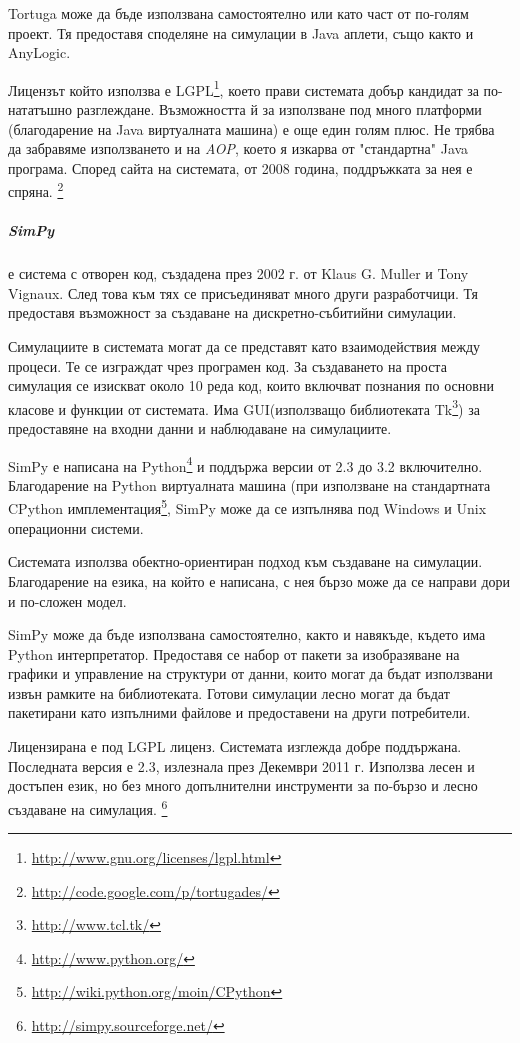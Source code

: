  			Tortuga може да бъде използвана самостоятелно или като част от по-голям проект. 
 			Тя предоставя споделяне на симулации в Java аплети, също както и AnyLogic.
 			
 			Лицензът който използва е \ac{LGPL}\footnote{\url{http://www.gnu.org/licenses/lgpl.html}}, 
 			което прави системата добър кандидат за по-нататъшно разглеждане.
 			Възможността й за използване под много платформи (благодарение на Java виртуалната машина) е 
 			още един голям плюс.
 			Не трябва да забравяме използването и на \emph{AOP}, което я изкарва от "стандартна" Java програма.
 			Според сайта на системата, от 2008 година, поддръжката за нея е спряна. \footnote{\url{http://code.google.com/p/tortugades/}}
					
		\subparagraph{SimPy} е система с отворен код, създадена през 2002 г. от Klaus G. Muller и Tony Vignaux. След това
			към тях се присъединяват много други разработчици. 
			Тя предоставя възможност за създаване на дискретно-събитийни симулации.
			
			Симулациите в системата могат да се представят като взаимодействия между процеси. Те се изграждат чрез
			програмен код. За създаването на проста симулация се изискват около 10 реда код, 
			които включват познания по основни класове и функции от системата. Има GUI(използващо библиотеката 
			Tk\footnote{\url{http://www.tcl.tk/}}) за предоставяне на входни данни и наблюдаване на симулациите.						
		
			SimPy е написана на Python\footnote{\url{http://www.python.org/}} и поддържа версии от 2.3 до 3.2 включително.
			Благодарение на Python виртуалната машина (при използване на стандартната CPython 
			имплементация\footnote{\url{http://wiki.python.org/moin/CPython}}, SimPy може да се изпълнява под 
			Windows и Unix операционни системи.
		
			Системата използва обектно-ориентиран подход към създаване на симулации. Благодарение на езика, на който е
			написана, с нея бързо може да се направи дори и по-сложен модел.
								
			SimPy може да бъде използвана самостоятелно, както и навякъде, където има Python интерпретатор.
			Предоставя се набор от пакети за изобразяване на графики и управление на структури от данни, които могат
			да бъдат използвани извън рамките на библиотеката. Готови симулации лесно могат да бъдат пакетирани
			като изпълними файлове и предоставени на други потребители.

				Лицензирана е под \ac{LGPL} лиценз. Системата изглежда добре поддържана. Последната версия е 2.3, излезнала през 
			Декември 2011 г. Използва лесен и достъпен език, но без много допълнителни инструменти за по-бързо и лесно
			създаване на симулация. \footnote{\url{http://simpy.sourceforge.net/}}
				
